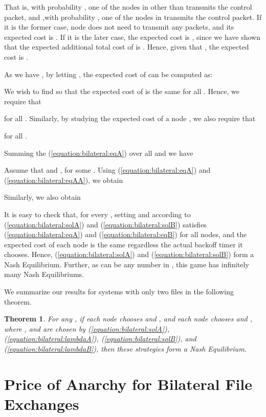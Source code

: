 \documentclass[11pt, conference]{IEEEtran}
\newtheorem{theorem}{Theorem}
\begin{document}
That is, with probability , one of the nodes in  other than  transmits the control packet, and ,with probability , one of the nodes in  transmits the control packet. If it is the former case, node  does not need to transmit any packets, and its expected cost is . If it is the later case, the expected cost is , since we have shown that the expected additional total cost of  is . Hence, given that , the expected cost is .

As we have , by letting , the expected cost of  can be computed as:


We wish to find  so that the expected cost of  is the same for all . Hence, we require that

for all . Similarly, by studying the expected cost of a node , we also require that

for all .

Summing the (\ref{equation:bilateral:eqA}) over all  and we have


Assume that  and , for some . Using (\ref{equation:bilateral:eqA}) and (\ref{equation:bilateral:eqAA}), we obtain

Similarly, we also obtain


It is easy to check that, for every , setting  and  according to (\ref{equation:bilateral:solA}) and (\ref{equation:bilateral:solB}) satisfies (\ref{equation:bilateral:eqA}) and (\ref{equation:bilateral:eqB}) for all nodes, and the expected cost of each node is the same regardless the actual backoff timer it chooses. Hence, (\ref{equation:bilateral:solA}) and (\ref{equation:bilateral:solB}) form a Nash Equilibrium. Further, as  can be any number in , this game has infinitely many Nash Equilibriums.

We summarize our results for systems with only two files in the following theorem.
\begin{theorem}	\label{theorem:bilateral:NE}
For any , if each node  chooses  and , and each node  chooses  and , where , and  are chosen by (\ref{equation:bilateral:solA}), (\ref{equation:bilateral:lambdaA}),  (\ref{equation:bilateral:solB}), and (\ref{equation:bilateral:lambdaB}), then these strategies form a Nash Equilibrium.
\end{theorem}



\section{Price of Anarchy for Bilateral File Exchanges}
\label{section:price of anarchy}
\end{document}
